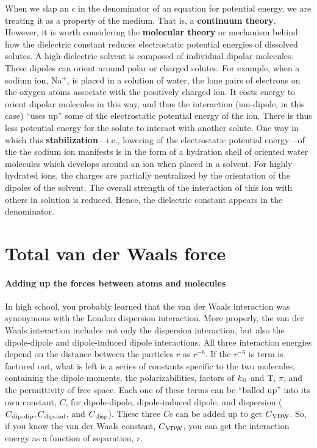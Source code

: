     When we slap an $\epsilon$ in the denominator of an equation for potential energy, we are treating it as a property of the medium. That is, a \textbf{continuum theory}. However, it is worth considering the \textbf{molecular theory} or mechanism behind how the dielectric constant reduces electrostatic potential energies of dissolved solutes. A high-dielectric solvent is composed of individual dipolar molecules. These dipoles can orient around polar or charged solutes. For example, when a sodium ion, Na$^+$, is placed in a solution of water, the lone pairs of electrons on the oxygen atoms associate with the positively charged ion. It costs energy to orient dipolar molecules in this way, and thus the interaction (ion-dipole, in this case) ``uses up'' some of the electrostatic potential energy of the ion. There is thus less potential energy for the solute to interact with another solute. One way in which this \textbf{stabilization}---i.e., lowering of the electrostatic potential energy---of the the sodium ion manifests is in the form of a hydration shell of oriented water molecules which develops around an ion when placed in a solvent. For highly hydrated ions, the charges are partially neutralized by the orientation of the dipoles of the solvent. The overall strength of the interaction of this ion with others in solution is reduced. Hence, the dielectric constant appears in the denominator. 

\section{Total van der Waals force}

\paragraph{Adding up the forces between atoms and molecules}
    In high school, you probably learned that the van der Waals interaction was synonymous with the London dispersion interaction. More properly, the van der Waals interaction includes not only the dispersion interaction, but also the dipole-dipole and dipole-induced dipole interactions. All three interaction energies depend on the distance between the particles $r$ as $r^{-6}$. If the $r^{-6}$ is term is factored out, what is left is a series of constants specific to the two molecules, containing the dipole moments, the polarizabilities, factors of $k\textsubscript{B}$ and T, $\pi$, and the permittivity of free space. Each one of these terms can be ``balled up'' into its own constant, $C$, for dipole-dipole, dipole-induced dipole, and dispersion ($C\textsubscript{dip-dip}, C\textsubscript{dip-ind}$, and $C\textsubscript{disp}$). These three $C$s can be added up to get $C\textsubscript{VDW}$. So, if you know the van der Waals constant, $C\textsubscript{VDW}$, you can get the interaction energy as a function of separation, $r$.

